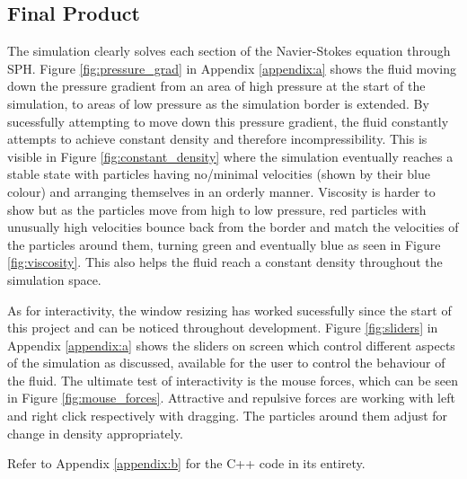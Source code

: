 \documentclass[write-up.tex]{subfiles}
\begin{document}
\subsection{Final Product}
The simulation clearly solves each section of the Navier-Stokes equation through SPH. Figure \ref{fig:pressure_grad} in Appendix \ref{appendix:a} shows the fluid moving down the pressure gradient from an area of high pressure at the start of the simulation, to areas of low pressure as the simulation border is extended. By sucessfully attempting to move down this pressure gradient, the fluid constantly attempts to achieve constant density and therefore incompressibility. This is visible in Figure \ref{fig:constant_density} where the simulation eventually reaches a stable state with particles having no/minimal velocities (shown by their blue colour) and arranging themselves in an orderly manner. Viscosity is harder to show but as the particles move from high to low pressure, red particles with unusually high velocities bounce back from the border and match the velocities of the particles around them, turning green and eventually blue as seen in Figure \ref{fig:viscosity}. This also helps the fluid reach a constant density throughout the simulation space.

As for interactivity, the window resizing has worked sucessfully since the start of this project and can be noticed throughout development. Figure \ref{fig:sliders} in Appendix \ref{appendix:a} shows the sliders on screen which control different aspects of the simulation as discussed, available for the user to control the behaviour of the fluid. The ultimate test of interactivity is the mouse forces, which can be seen in Figure \ref{fig:mouse_forces}. Attractive and repulsive forces are working with left and right click respectively with dragging. The particles around them adjust for change in density appropriately.

Refer to Appendix \ref{appendix:b} for the C++ code in its entirety.
\end{document}
